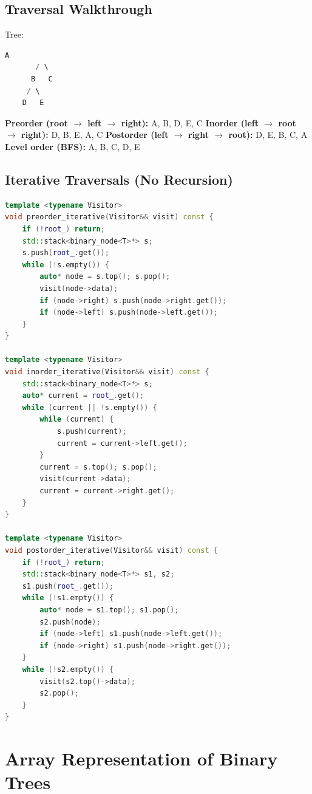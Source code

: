 \subsection{Traversal Walkthrough}

Tree:
\begin{lstlisting}[language=Java]
        A
       / \
      B   C
     / \
    D   E
\end{lstlisting}

\textbf{Preorder (root $\to $ left $\to $ right):} A, B, D, E, C
\textbf{Inorder (left $\to $ root $\to $ right):} D, B, E, A, C
\textbf{Postorder (left $\to $ right $\to $ root):} D, E, B, C, A
\textbf{Level order (BFS):} A, B, C, D, E

\subsection{Iterative Traversals (No Recursion)}

\begin{lstlisting}[language=C++]
template <typename Visitor>
void preorder_iterative(Visitor&& visit) const {
    if (!root_) return;
    std::stack<binary_node<T>*> s;
    s.push(root_.get());
    while (!s.empty()) {
        auto* node = s.top(); s.pop();
        visit(node->data);
        if (node->right) s.push(node->right.get());
        if (node->left) s.push(node->left.get());
    }
}

template <typename Visitor>
void inorder_iterative(Visitor&& visit) const {
    std::stack<binary_node<T>*> s;
    auto* current = root_.get();
    while (current || !s.empty()) {
        while (current) {
            s.push(current);
            current = current->left.get();
        }
        current = s.top(); s.pop();
        visit(current->data);
        current = current->right.get();
    }
}

template <typename Visitor>
void postorder_iterative(Visitor&& visit) const {
    if (!root_) return;
    std::stack<binary_node<T>*> s1, s2;
    s1.push(root_.get());
    while (!s1.empty()) {
        auto* node = s1.top(); s1.pop();
        s2.push(node);
        if (node->left) s1.push(node->left.get());
        if (node->right) s1.push(node->right.get());
    }
    while (!s2.empty()) {
        visit(s2.top()->data);
        s2.pop();
    }
}
\end{lstlisting}

\section{Array Representation of Binary Trees}

